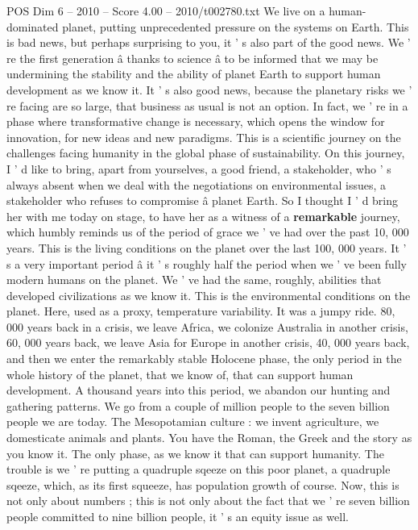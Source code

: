 \begin{textsample}{POS Dim 6 – 2010 – Score 4.00 – 2010/t002780.txt}  \label{ex:f6_pos_039}
We live on a human-dominated planet, putting unprecedented pressure on the systems on Earth.
This is bad news, but perhaps surprising to you, it ' s also part of the good news.
We ' re the first generation â thanks to science â to be informed that we may be undermining the stability and the ability of planet Earth to support human development as we know it.
It ' s also good news, because the planetary risks we ' re facing are so large, that business as usual is not an option.
In fact, we ' re in a phase where transformative change is necessary, which opens the window for innovation, for new ideas and new paradigms.
This is a scientific journey on the challenges facing humanity in the global phase of sustainability.
On this journey, I ' d like to bring, apart from yourselves, a good friend, a stakeholder, who ' s always absent when we deal with the negotiations on environmental issues, a stakeholder who refuses to compromise â planet Earth.
So I thought I ' d bring her with me today on stage, to have her as a witness of a \textbf{remarkable} journey, which humbly reminds us of the period of grace we ' ve had over the past 10, 000 years.
This is the living conditions on the planet over the last 100, 000 years.
It ' s a very important period â it ' s roughly half the period when we ' ve been fully modern humans on the planet.
We ' ve had the same, roughly, abilities that developed civilizations as we know it.
This is the environmental conditions on the planet.
Here, used as a proxy, temperature variability.
It was a jumpy ride. 80, 000 years back in a crisis, we leave Africa, we colonize Australia in another crisis, 60, 000 years back, we leave Asia for Europe in another crisis, 40, 000 years back, and then we enter the remarkably stable Holocene phase, the only period in the whole history of the planet, that we know of, that can support human development.
A thousand years into this period, we abandon our hunting and gathering patterns.
We go from a couple of million people to the seven billion people we are today.
The Mesopotamian culture : we invent agriculture, we domesticate animals and plants.
You have the Roman, the Greek and the story as you know it.
The only phase, as we know it that can support humanity.
The trouble is we ' re putting a quadruple sqeeze on this poor planet, a quadruple sqeeze, which, as its first squeeze, has population growth of course.
Now, this is not only about numbers ; this is not only about the fact that we ' re seven billion people committed to nine billion people, it ' s an equity issue as well.

\end{textsample}
